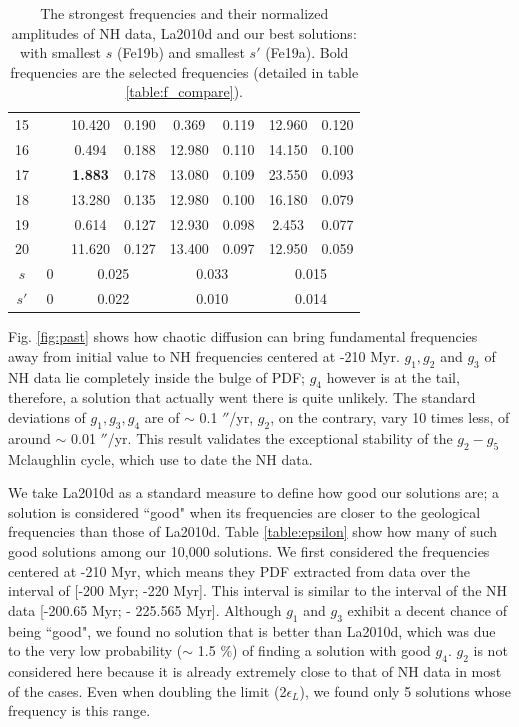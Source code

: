 \documentclass[12pt]{article}
\begin{document}
\begin{table}[t]
\begin{tabular}{ccccccccc}
			15 &  &  & 10.420 & 0.190 & 0.369 & 0.119 & 12.960 & 0.120 \\
			16 &  &  & 0.494 & 0.188 & 12.980 & 0.110 & 14.150 & 0.100 \\
			17 &  &  & \textbf{1.883} & 0.178 & 13.080 & 0.109 & 23.550 & 0.093 \\
			18 &  &  & 13.280 & 0.135 & 12.980 & 0.100 & 16.180 & 0.079 \\
			19 &  &  & 0.614 & 0.127 & 12.930 & 0.098 & 2.453 & 0.077 \\
			20 &  &  & 11.620 & 0.127 & 13.400 & 0.097 & 12.950 & 0.059 \\
			{$s$}              & \multicolumn{2}{c}{0}            & \multicolumn{2}{c}{0.025}                         & \multicolumn{2}{c}{0.033}                         & \multicolumn{2}{c}{0.015}                        \\
			{$s'$}              & \multicolumn{2}{c}{0}            & \multicolumn{2}{c}{0.022}                         & \multicolumn{2}{c}{0.010}                         & \multicolumn{2}{c}{0.014}                        \\
			\hline
		\end{tabular} 
		\caption{The strongest frequencies and their normalized amplitudes of NH data, La2010d and our best solutions: with smallest $s$ (Fe19b) and smallest $s'$ (Fe19a). Bold frequencies are the selected frequencies (detailed in table \ref{table:f_compare}).}
		\label{table:fa_compare}
	\end{table}
	Fig. \ref{fig:past} shows how chaotic diffusion can bring fundamental frequencies away from initial value to NH frequencies centered at -210 Myr. $g_1, g_2$ and $g_3$ of NH data lie completely inside the bulge of PDF; $g_4$ however is at the tail, therefore, a solution that actually went there is quite unlikely. The standard deviations of $g_1, g_3, g_4$ are of $\sim$ 0.1 $''$/yr, $g_2$, on the contrary, vary 10 times less, of around $\sim$  0.01 $''$/yr. This result validates the exceptional stability of the $g_2 - g_5$ Mclaughlin cycle, which \cite{olsen2019} use to date the NH data.
	
	We take La2010d as a standard measure to define how good our solutions are; a solution is considered ``good" when its frequencies are closer to the geological frequencies than those of La2010d. Table \ref{table:epsilon} show how many of such good solutions among our 10,000 solutions. We first considered the frequencies centered at -210 Myr, which means they PDF extracted from data over the interval of [-200 Myr; -220 Myr]. This interval is similar to the interval of the NH data [-200.65 Myr; - 225.565 Myr]. Although $g_1$ and $g_3$ exhibit a decent chance of being ``good", we found no solution that is better than La2010d, which was due to the very low probability ($\sim$ 1.5 $\%$) of finding a solution with good $g_4$. $g_2$ is not considered here because it is already extremely close to that of NH data in most of the cases. Even when doubling the limit (2$\epsilon_L$), we found only 5 solutions whose frequency is this range.
	
\end{document}
